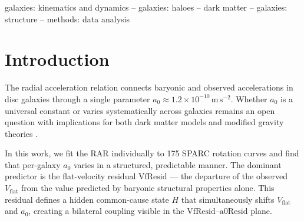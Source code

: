 \documentclass[fleqn,usenatbib]{mnras}
\newcommand{\vflat}{V_\mathrm{flat}}
\newcommand{\azero}{a_0}
\newcommand{\vfresid}{\mathrm{VfResid}}
\newcommand{\aresid}{\mathrm{a0Resid}}
\newcommand{\mtwo}{m{=}2}
\begin{document}
\begin{abstract}
We do not claim final identification of the fundamental physics, but we do claim a robust identification of the hidden state's direct observational carrier --- the outer-halo $\mtwo$ velocity-field mode ($\sim$95~per~cent confidence) --- and a strong narrowing of its physical interpretation toward a triaxial or closely related halo-shape state ($\sim$90~per~cent confidence), pending confirmation with dedicated 2D follow-up observations beyond the current $N = 7$ THINGS sample.
The information ceiling of 1D rotation curves arises because azimuthal averaging destroys $\mtwo$ structure by construction, preserving only integral mass shifts that produce the bilateral coupling.

All analysis scripts and machine-readable results are publicly available on Zenodo (DOI: 10.5281/zenodo.19444465).
\end{abstract}

\begin{keywords}
galaxies: kinematics and dynamics -- galaxies: haloes -- dark matter -- galaxies: structure -- methods: data analysis
\end{keywords}


\section{Introduction}
\label{sec:intro}

The radial acceleration relation \citep[RAR;][]{McGaugh2016} connects baryonic and observed accelerations in disc galaxies through a single parameter $\azero \approx 1.2 \times 10^{-10}\,\mathrm{m\,s}^{-2}$.
Whether $\azero$ is a universal constant or varies systematically across galaxies remains an open question with implications for both dark matter models and modified gravity theories \citep{LelliMcGaughSchombert2017, Rodrigues2018, Marra2020}.

In this work, we fit the RAR individually to 175 SPARC rotation curves \citep{Lelli2016} and find that per-galaxy $\azero$ varies in a structured, predictable manner.
The dominant predictor is the flat-velocity residual $\vfresid$ --- the departure of the observed $\vflat$ from the value predicted by baryonic structural properties alone.
This residual defines a hidden common-cause state $H$ that simultaneously shifts $\vflat$ and $\azero$, creating a bilateral coupling visible in the $\vfresid$--$\aresid$ plane.
\end{document}
